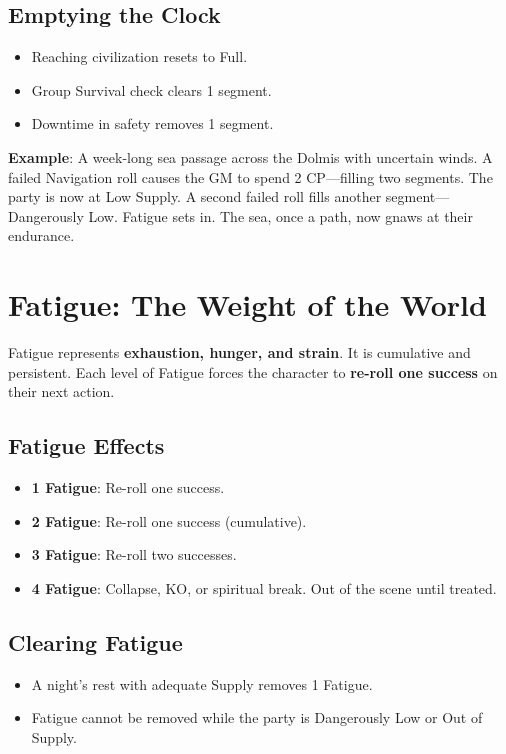 \subsection*{Emptying the Clock}

\begin{itemize}
    \item Reaching civilization resets to Full.
    \item Group Survival check clears 1 segment.
    \item Downtime in safety removes 1 segment.
\end{itemize}

\textbf{Example}: A week-long sea passage across the Dolmis with uncertain winds. A failed Navigation roll causes the GM to spend 2 CP—filling two segments. The party is now at Low Supply. A second failed roll fills another segment—Dangerously Low. Fatigue sets in. The sea, once a path, now gnaws at their endurance.

\section*{Fatigue: The Weight of the World}

Fatigue represents \textbf{exhaustion, hunger, and strain}. It is cumulative and persistent. Each level of Fatigue forces the character to \textbf{re-roll one success} on their next action.

\subsection*{Fatigue Effects}

\begin{itemize}
    \item \textbf{1 Fatigue}: Re-roll one success.
    \item \textbf{2 Fatigue}: Re-roll one success (cumulative).
    \item \textbf{3 Fatigue}: Re-roll two successes.
    \item \textbf{4 Fatigue}: Collapse, KO, or spiritual break. Out of the scene until treated.
\end{itemize}

\subsection*{Clearing Fatigue}

\begin{itemize}
    \item A night’s rest with adequate Supply removes 1 Fatigue.
    \item Fatigue cannot be removed while the party is Dangerously Low or Out of Supply.
\end{itemize}


